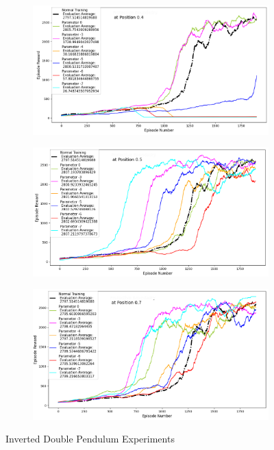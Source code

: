 \documentclass[journal]{IEEEtran}
\begin{document}
\begin{figure}
    \centering
    \begin{subfigure}[b]{0.5\textwidth}
      \centering
      \includegraphics[width=\textwidth]{Double_Pendulum_with_Boundary_at_0.4.png}
    \end{subfigure}
    \vspace*{0.0mm}
    \begin{subfigure}[b]{0.5\textwidth}
      \centering
      \includegraphics[width=\textwidth]{Double_Pendulum_with_Boundary_at_0.5.png}
    \end{subfigure}
    \vspace*{0.0mm}
    \begin{subfigure}[b]{0.5\textwidth}
      \centering
      \includegraphics[width=\textwidth]{Double_Pendulum_with_Boundary_at_0.7.png}
    \end{subfigure}
    \caption{Inverted Double Pendulum Experiments}
    \label{fig:Double Pendulum}
\end{figure}
\end{document}
